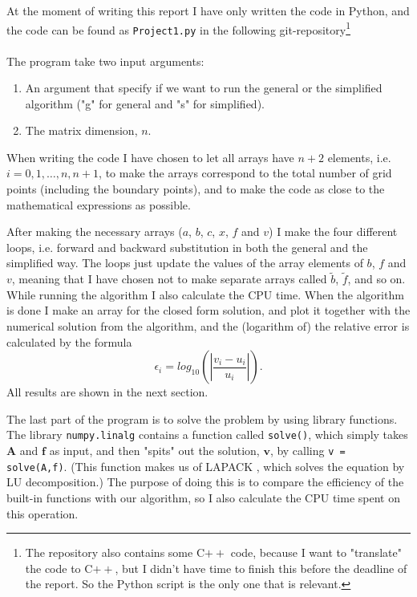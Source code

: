\documentclass[12pt, a4paper]{article}
\begin{document}
At the moment of writing this report I have only written the code in Python, and the code can be found as
\texttt{Project1.py} in the following git-repository\footnote{The repository also contains some C$++$ code,  
 because I want to "translate" the code to C$++$, but I didn't have time to finish this before the 
deadline of the report. So the Python script is the only one that is relevant.} \vspace{0.5cm} \\ 
 \vspace{0.5cm} \\ 
The program take two input arguments: 
\begin{enumerate}
\item An argument that specify if we want to run the general or the simplified algorithm ("g" for 
general and "s" for simplified). 
\item The matrix dimension, $n$. 
\end{enumerate}  

When writing the code I have chosen to let all arrays have $n+2$ elements, i.e. $i = 0,1,\dots,n,n+1$, to 
make the arrays correspond to the total number of grid points (including the boundary points), and 
to make the code as close to the mathematical expressions as possible.

After making the necessary arrays ($a$, $b$, $c$, $x$, $f$ and $v$) I make the four different loops, i.e. 
forward and backward substitution in both the general and the simplified way. The loops just update the 
values of the array elements of $b$, $f$ and $v$, meaning that I have chosen not to make separate arrays 
called $\tilde{b}$, $\tilde{f}$, and so on. While running the algorithm I also calculate the CPU time. 
When the algorithm is done I make an array for the closed form solution, and plot it together with the 
numerical solution from the algorithm, and the (logarithm of) the relative error is calculated by the
formula
\begin{equation}
\epsilon_i = log_{10}\left(\left| \frac{v_i - u_i}{u_i} \right| \right). 
\label{eq:error}
\end{equation}
All results are shown in the next section. 
   
The last part of the program is to solve the problem by using library functions. The library 
\texttt{numpy.linalg} \cite{numpy.linalg} contains a function called \texttt{solve()}, which simply takes 
$\mathbf{A}$ and $\mathbf{f}$ as input, and then "spits" out the solution, $\mathbf{v}$, by calling 
\texttt{v = solve(A,f)}. (This function makes us of LAPACK \cite{LAPACK}, which solves the equation by 
LU decomposition.) The purpose of doing this is to compare the efficiency of 
the built-in functions with our algorithm, so I also calculate the CPU time spent on this operation. 
\end{document}
